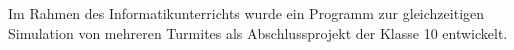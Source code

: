 Im Rahmen des Informatikunterrichts wurde ein Programm zur gleichzeitigen Simulation von mehreren Turmites als Abschlussprojekt der Klasse 10 entwickelt. 